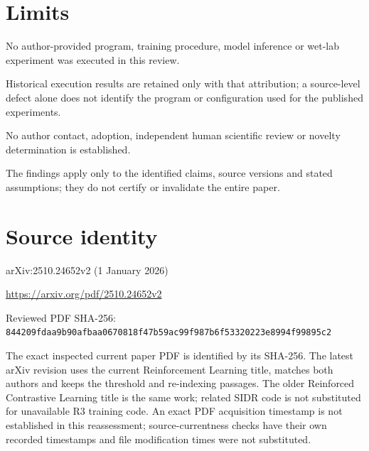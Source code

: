 \documentclass[11pt]{article}
\begin{document}
\section*{Limits}

No author-provided program, training procedure, model inference or wet-lab experiment was executed in this review.\par

Historical execution results are retained only with that attribution; a source-level defect alone does not identify the program or configuration used for the published experiments.\par

No author contact, adoption, independent human scientific review or novelty determination is established.\par

The findings apply only to the identified claims, source versions and stated assumptions; they do not certify or invalidate the entire paper.\par

\section*{Source identity}

arXiv:2510.24652v2 (1 January 2026)

\url{https://arxiv.org/pdf/2510.24652v2}

Reviewed PDF SHA-256: \nolinkurl{844209fdaa9b90afbaa0670818f47b59ac99f987b6f53320223e8994f99895c2}

The exact inspected current paper PDF is identified by its SHA-256. The latest arXiv revision uses the current Reinforcement Learning title, matches both authors and keeps the threshold and re-indexing passages. The older Reinforced Contrastive Learning title is the same work; related SIDR code is not substituted for unavailable R3 training code. An exact PDF acquisition timestamp is not established in this reassessment; source-currentness checks have their own recorded timestamps and file modification times were not substituted.
\end{document}

